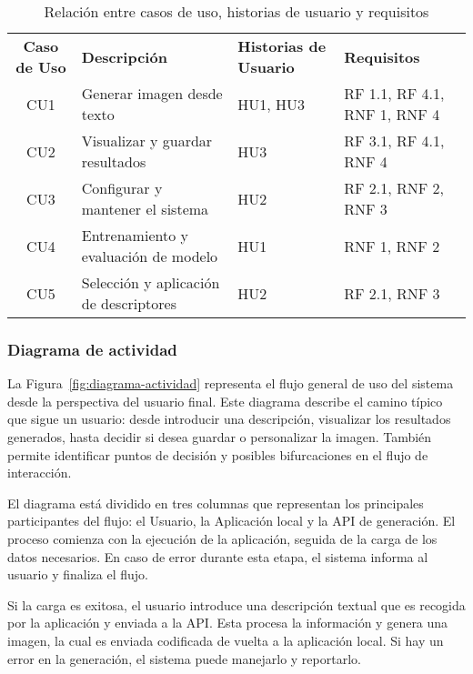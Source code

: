 \begin{table}[H]
    \centering
    \renewcommand{\arraystretch}{1.4}
    \begin{tabular}{cp{4.5cm}p{2.5cm}p{4cm}}
        \rowcolor{gray!30}
        \textbf{Caso de Uso} & \textbf{Descripción} & \textbf{Historias de Usuario} & \textbf{Requisitos} \\
        \rowcolor{gray!10}
        CU1 & Generar imagen desde texto & HU1, HU3 & RF 1.1, RF 4.1, RNF 1, RNF 4 \\
        \addlinespace
        CU2 & Visualizar y guardar resultados & HU3 & RF 3.1, RF 4.1, RNF 4 \\
        \rowcolor{gray!10}
        CU3 & Configurar y mantener el sistema & HU2 & RF 2.1, RNF 2, RNF 3 \\
        \addlinespace
        CU4 & Entrenamiento y evaluación de modelo & HU1 & RNF 1, RNF 2 \\
        \rowcolor{gray!10}
        CU5 & Selección y aplicación de descriptores & HU2 & RF 2.1, RNF 3 \\
    \end{tabular}
    \caption{Relación entre casos de uso, historias de usuario y requisitos}
    \label{tab:trazabilidad-casos-hu-req}
\end{table}

\subsubsection{Diagrama de actividad}
La Figura~\ref{fig:diagrama-actividad} representa el flujo general de uso del sistema desde la perspectiva del usuario final. Este diagrama describe el camino típico que sigue un usuario: desde introducir una descripción, visualizar los resultados generados, hasta decidir si desea guardar o personalizar la imagen. También permite identificar puntos de decisión y posibles bifurcaciones en el flujo de interacción.

El diagrama está dividido en tres columnas que representan los principales participantes del flujo: el Usuario, la Aplicación local y la API de generación. El proceso comienza con la ejecución de la aplicación, seguida de la carga de los datos necesarios. En caso de error durante esta etapa, el sistema informa al usuario y finaliza el flujo.

Si la carga es exitosa, el usuario introduce una descripción textual que es recogida por la aplicación y enviada a la API. Esta procesa la información y genera una imagen, la cual es enviada codificada de vuelta a la aplicación local. Si hay un error en la generación, el sistema puede manejarlo y reportarlo.

